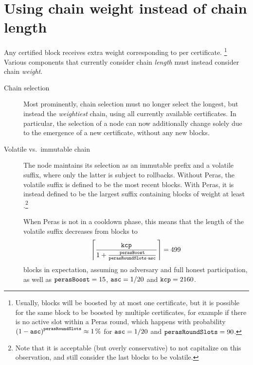 \section{Using chain weight instead of chain length}

Any certified block receives extra weight corresponding to \perasBoost{} per certificate.%
\footnote{Usually, blocks will be boosted by at most one certificate, but it is possible for the same block to be boosted by multiple certificates, for example if there is no active slot within a Peras round, which happens with probability ${(1-\mathtt{asc})}^{\mathtt{perasRoundSlots}} \approx \qty{1}{\percent}$ for $\mathtt{asc}=1/20$ and $\mathtt{perasRoundSlots}=90$.}
Various components that currently consider chain \emph{length} must instead consider chain \emph{weight}.

\begin{description}
\item[Chain selection]
  Most prominently, chain selection must no longer select the longest, but instead the \emph{weightiest} chain, using all currently available certificates.
  In particular, the selection of a node can now additionally change solely due to the emergence of a new certificate, without any new blocks.
\item[Volatile vs.\ immutable chain]
  The node maintains its selection as an immutable prefix and a volatile suffix, where only the latter is subject to rollbacks.
  Without Peras, the volatile suffix is defined to be the \kcp{} most recent blocks.
  With Peras, it is instead defined to be the largest suffix containing blocks of weight at least \kcp{}.\footnote{
    Note that it is acceptable (but overly conservative) to not capitalize on this observation, and still consider the last \kcp{} blocks to be volatile.}

  When Peras is not in a cooldown phase, this means that the length of the volatile suffix decreases from \kcp{} blocks to
  \[ \left\lceil \frac{\mathtt{kcp} }{1 + \frac{\mathtt{perasBoost}}{\mathtt{perasRoundSlots} \cdot \mathtt{asc}}} \right\rceil = 499 \]
  blocks in expectation, assuming no adversary and full honest participation, as well as $\mathtt{perasBoost} = 15$, $\mathtt{asc} = 1/20$ and $\mathtt{kcp} = 2160$.


\end{description}
